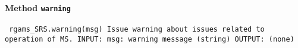 \paragraph{Method \texttt{warning}}
\vspace{1ex}
\texttt{\newline
rgams_SRS.warning(msg)\newline
\newline
Issue warning about issues related to operation of MS.\newline
\newline
INPUT:\newline
msg: warning message (string)\newline
\newline
OUTPUT:\newline
(none)\newline
\newline
}

